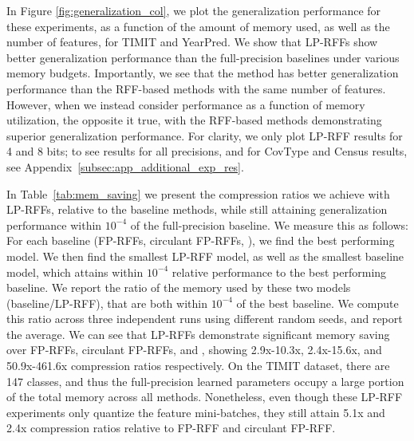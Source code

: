 In Figure \ref{fig:generalization_col}, we plot the generalization performance for these experiments, as a function of the amount of memory used, as well as the number of features, for TIMIT and YearPred. We show that LP-RFFs show better generalization performance than the full-precision baselines under various memory budgets. Importantly, we see that the \Nystrom method has better generalization performance than the RFF-based methods with the same number of features. However, when we instead consider performance as a function of memory utilization, the opposite it true, with the RFF-based methods demonstrating superior generalization performance. For clarity, we only plot LP-RFF results for 4 and 8 bits; to see results for all precisions, and for CovType and Census results, see Appendix~\ref{subsec:app_additional_exp_res}.

In Table~\ref{tab:mem_saving} we present the compression ratios we achieve with LP-RFFs, relative to the baseline methods, while still attaining generalization performance within $10^{-4}$ of the full-precision baseline.  We measure this as follows: For each baseline (FP-RFFs, circulant FP-RFFs, \NystromNS), we find the best performing model. We then find the smallest LP-RFF model, as well as the smallest baseline model, which attains within $10^{-4}$ relative performance to the best performing baseline. We report the ratio of the memory used by these two models (baseline/LP-RFF), that are both within $10^{-4}$ of the best baseline. We compute this ratio across three independent runs using different random seeds, and report the average.  We can see that LP-RFFs demonstrate significant memory saving over FP-RFFs, circulant FP-RFFs, and \NystromNS, showing 2.9x-10.3x, 2.4x-15.6x, and 50.9x-461.6x compression ratios respectively. On the TIMIT dataset, there are 147 classes, and thus the full-precision learned parameters occupy a large portion of the total memory across all methods. Nonetheless, even though these LP-RFF experiments only quantize the feature mini-batches, they still attain 5.1x and 2.4x compression ratios relative to FP-RFF and circulant FP-RFF.


